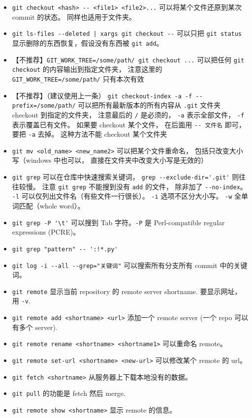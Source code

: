 \begin{itemize}
\item \verb`git checkout <hash> -- <file1> <file2>...` 可以将某个文件还原到某次 commit 的状态。 同样也适用于文件夹。
\item \verb`git ls-files --deleted | xargs git checkout --` 可以只把 \verb`git status` 显示删除的东西恢复，假设没有东西被 \verb`git add`。
\item 【不推荐】\verb`GIT_WORK_TREE=/some/path/ git checkout ...` 可以把任何 \verb`git checkout` 的内容输出到指定文件夹， 注意这里的 \verb`GIT_WORK_TREE=/some/path/` 只有本次有效
\item 【不推荐】（建议使用上一条） \verb`git checkout-index -a -f --prefix=/some/path/` 可以把所有最新版本的所有内容从 \verb`.git` 文件夹 checkout 到指定的文件夹， 注意最后的 \verb`/` 是必须的， \verb`-a` 表示全部文件， \verb`-f` 表示覆盖已有文件。 如果要 checkout 某个文件， 在后面用 \verb`-- 文件名` 即可， 要把 \verb`-a` 去掉。 这种方法不能 checkout 某个文件夹
\item \verb`git mv <old_name> <new_name2>` 可以把某个文件重命名， 包括只改变大小写（windows 中也可以， 直接在文件夹中改变大小写是无效的）
\item \verb`git grep` 可以在仓库中快速搜索关键词， \verb`grep --exclude-dir='.git'` 则往往较慢。 注意 \verb`git grep` 不能搜到没有 \verb`add` 的文件， 除非加了 \verb`--no-index`。 \verb`-l` 可以仅列出文件名（有些文件一行很长）。 \verb`-i` 选项不区分大小写。 \verb`-w` 全单词匹配（whole word）。
\item \verb`git grep -P '\t'` 可以搜到 Tab 字符。\verb`-P` 是 Perl-compatible regular expressions (PCRE)。
\item \verb`git grep "pattern" -- ':!*.py'`
\item \verb`git log -i --all --grep="关键词"` 可以搜索所有分支所有 commit 中的关键词。
\item \verb`git remote` 显示当前 repository 的 remote server shortname. 要显示网址， 用 \verb`-v`.
\item \verb`git remote add <shortname> <url>` 添加一个 remote server (一个 repo 可以有多个 server).
\item \verb`git remote rename <shortname> <shortname1>` 可以重命名 remote。
\item \verb`git remote set-url <shortname> <new-url>` 可以修改某个 remote 的 url。
\item \verb`git fetch <shortname>` 从服务器上下载本地没有的数据。
\item \verb`git pull` 的功能是 fetch 然后 merge.
\item \verb`git remote show <shortname>` 显示 remote 的信息。

\end{itemize}

